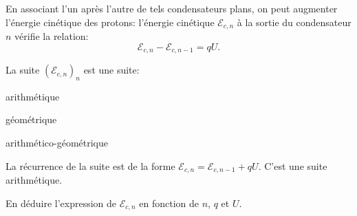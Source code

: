 

\newpage

\pauseEntrainement

En associant l'un après l'autre de tels condensateurs plans, on peut augmenter l'énergie cinétique des protons: l'énergie cinétique $\mathcal{E}_{c,n}$ à la sortie du condensateur $n$ vérifie la relation:
\[
\mathcal{E}_{c,n}-\mathcal{E}_{c,n-1}=qU.
\]

\repriseEntrainement



\begin{enonce}
La suite $\left(\mathcal{E}_{c,n}\right)_n$ est une suite:

\begin{listeQCM3Colonnes}
\item arithmétique
\item géométrique
\item arithmético-géométrique
\end{listeQCM3Colonnes}
\bigskip
\end{enonce}

\reponse{\reponseA{}}

\begin{corrige}
La récurrence de la suite est de la forme $\mathcal{E}_{c,n}=\mathcal{E}_{c,n-1}+qU$.
C'est une suite arithmétique.
\end{corrige}



\begin{enonce}
En déduire l'expression de $\mathcal{E}_{c,n}$ en fonction de $n$, $q$ et $U$.
\end{enonce}




\pauseEntrainement

